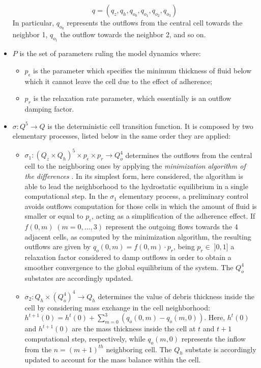 \begin{itemize}
	$$ q = (q_z, q_h, q_{o_0}, q_{o_1}, q_{o_2}, q_{o_3})$$ In
	particular, $q_{o_0}$ represents the outflows from the central
	cell towards the neighbor 1, $q_{o_1}$ the outflow towards the
	neighbor 2, and so on.
	
	\item $P$ is the set of parameters ruling the model
	dynamics where:	
	\begin{itemize}
		\item $p_\epsilon$ is the parameter which specifies the minimum thickness of fluid below which it cannot leave the cell due to the effect of adherence;
		\item $p_r$ is the relaxation rate parameter,
		which essentially is an outflow damping factor.
	\end{itemize}
	
	\item $\sigma : Q^5 \rightarrow Q$ is the deterministic cell
	transition function. It is composed by two elementary processes,
	listed below in the same order they are applied:
	\begin{itemize}
		\item $\sigma_1 : (Q_z \times Q_h)^5 \times p_\epsilon \times
		p_r\rightarrow Q_o^4$ determines the outflows from the central
		cell to the neighboring ones by applying the \emph{minimization
			algorithm of the differences} \cite{Gregorio1999}. In
		its simplest form, here considered, the algorithm is able to
		lead the neighborhood to the hydrostatic equilibrium in a single
		computational step. In the $\sigma_1$ elementary process, a
		preliminary control avoids outflows computation for those cells
		in which the amount of fluid is smaller or equal to
		$p_\epsilon$, acting as a simplification of the adherence
		effect. If $f(0,m) \; (m=0, \ldots, 3)$ represent the outgoing
		flows towards the 4 adjacent cells, as computed by the
		minimization algorithm, the resulting outflows are given by
		$q_o(0,m)=f(0,m) \cdot p_r$, being $p_r \in \; ]0,1]$ a
		relaxation factor considered to damp outflows in order to
		obtain a smoother convergence to the global equilibrium of
		the system. The $Q_o^4$ substates are accordingly updated.
		
		\item $\sigma_2: Q_h \times (Q_o^4)^4 \rightarrow Q_h$
		determines the value of debris thickness inside the cell by
		considering mass exchange in the cell neighborhood:
		$h^{t+1}(0) = h^t(0) + \sum_{m=0}^3 (q_o(0,m) -
		q_o(m,0))$. Here, $h^{t}(0)$ and $h^{t+1}(0)$ are the mass
		thickness inside the cell at $t$ and $t+1$ computational
		step, respectively, while $q_o(m,0)$ represents the inflow
		from the $n=(m+1)^{th}$ neighboring cell. The $Q_h$ substate
		is accordingly updated to account for the mass balance
		within the cell.
	\end{itemize}
\end{itemize}


